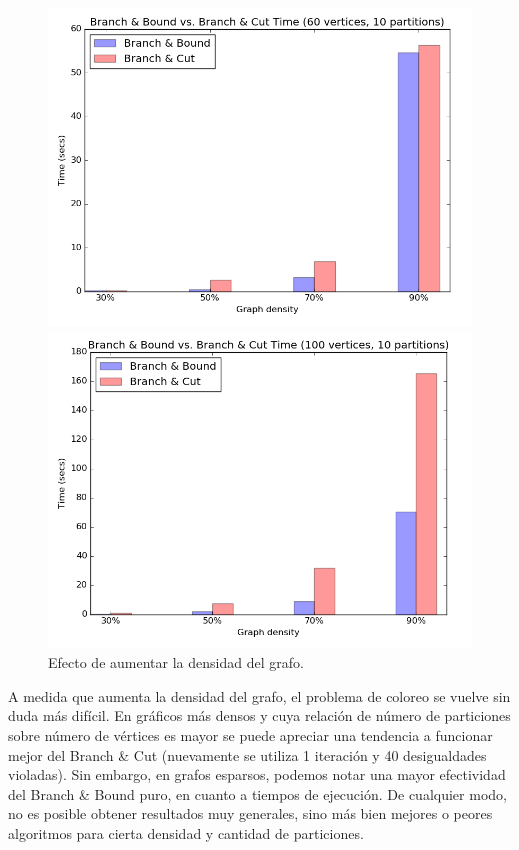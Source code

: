 \begin{figure}[h]
\begin{minipage}[b]{0.49\textwidth}
    \includegraphics[width=\textwidth]{img/1-bb_vs_bc_v60_p10_i1_co0_l40_t1_b0.png}
  \end{minipage}
  \hfill
  \begin{minipage}[b]{0.49\textwidth}
    \includegraphics[width=\textwidth]{img/1-bb_vs_bc_v100_p10_i1_co0_l40_t1_b0.png}
  \end{minipage}
	\caption{Efecto de aumentar la densidad del grafo.}
\end{figure}

A medida que aumenta la densidad del grafo, el problema de coloreo se vuelve sin duda más difícil. En gráficos más densos y cuya relación de número de particiones sobre número de vértices es mayor se puede apreciar una tendencia a funcionar mejor del Branch \& Cut (nuevamente se utiliza 1 iteración y 40 desigualdades violadas). Sin embargo, en grafos esparsos, podemos notar una mayor efectividad del Branch \& Bound puro, en cuanto a tiempos de ejecución. De cualquier modo, no es posible obtener resultados muy generales, sino más bien mejores o peores algoritmos para cierta densidad y cantidad de particiones.

